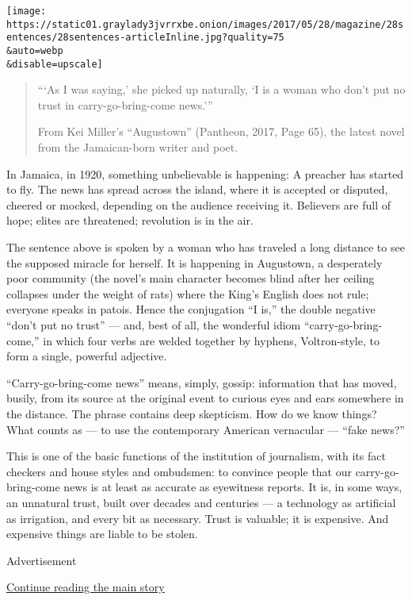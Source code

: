 \texttt{[image: https://static01.graylady3jvrrxbe.onion/images/2017/05/28/magazine/28sentences/28sentences-articleInline.jpg?quality=75\\\&auto=webp\\\&disable=upscale]}

\begin{quote}
```As I was saying,' she picked up naturally, `I is a woman who don't
put no trust in carry-go-bring-come news.'''

From Kei Miller's ``Augustown'' (Pantheon, 2017, Page 65), the latest
novel from the Jamaican-born writer and poet.
\end{quote}

In Jamaica, in 1920, something unbelievable is happening: A preacher has
started to fly. The news has spread across the island, where it is
accepted or disputed, cheered or mocked, depending on the audience
receiving it. Believers are full of hope; elites are threatened;
revolution is in the air.

The sentence above is spoken by a woman who has traveled a long distance
to see the supposed miracle for herself. It is happening in Augustown, a
desperately poor community (the novel's main character becomes blind
after her ceiling collapses under the weight of rats) where the King's
English does not rule; everyone speaks in patois. Hence the conjugation
``I is,'' the double negative ``don't put no trust'' --- and, best of
all, the wonderful idiom ``carry-go-bring-come,'' in which four verbs
are welded together by hyphens, Voltron-style, to form a single,
powerful adjective.

``Carry-go-bring-come news'' means, simply, gossip: information that has
moved, busily, from its source at the original event to curious eyes and
ears somewhere in the distance. The phrase contains deep skepticism. How
do we know things? What counts as --- to use the contemporary American
vernacular --- ``fake news?''

This is one of the basic functions of the institution of journalism,
with its fact checkers and house styles and ombudsmen: to convince
people that our carry-go-bring-come news is at least as accurate as
eyewitness reports. It is, in some ways, an unnatural trust, built over
decades and centuries --- a technology as artificial as irrigation, and
every bit as necessary. Trust is valuable; it is expensive. And
expensive things are liable to be stolen.

Advertisement

\protect\hyperlink{after-bottom}{Continue reading the main story}

